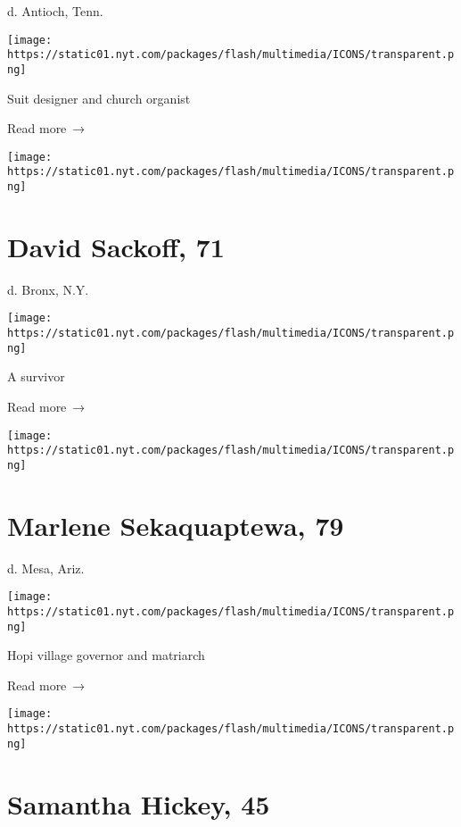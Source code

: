 d. Antioch, Tenn.

\texttt{[image: https://static01.nyt.com/packages/flash/multimedia/ICONS/transparent.png]}

Suit designer and church organist

 Read more~→

\href{https://www.nytimes.com/2020/07/25/obituaries/david-sackoff-dead-coronavirus.html}{}

\texttt{[image: https://static01.nyt.com/packages/flash/multimedia/ICONS/transparent.png]}

\hypertarget{david-sackoff-71}{%
\section{David Sackoff, 71}\label{david-sackoff-71}}

d. Bronx, N.Y.

\texttt{[image: https://static01.nyt.com/packages/flash/multimedia/ICONS/transparent.png]}

A survivor

 Read more~→

\href{https://www.nytimes.com/2020/07/24/obituaries/marlene-sekaquaptewa-dead.html}{}

\texttt{[image: https://static01.nyt.com/packages/flash/multimedia/ICONS/transparent.png]}

\hypertarget{marlene-sekaquaptewa-79}{%
\section{Marlene Sekaquaptewa, 79}\label{marlene-sekaquaptewa-79}}

d. Mesa, Ariz.

\texttt{[image: https://static01.nyt.com/packages/flash/multimedia/ICONS/transparent.png]}

Hopi village governor and matriarch

 Read more~→

\href{https://www.nytimes.com/2020/07/23/obituaries/samantha-hickey-dead-coronavirus.html}{}

\texttt{[image: https://static01.nyt.com/packages/flash/multimedia/ICONS/transparent.png]}

\hypertarget{samantha-hickey-45}{%
\section{Samantha Hickey, 45}\label{samantha-hickey-45}}

